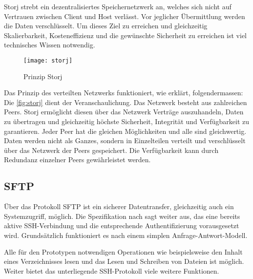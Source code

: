 Storj strebt ein dezentralisiertes Speichernetzwerk an, welches sich nicht auf Vertrauen zwischen Client und Host verlässt. Vor jeglicher Übermittlung werden die Daten verschlüsselt. Um dieses Ziel zu erreichen und gleichzeitig Skalierbarkeit, Kosteneffizienz und die gewünschte Sicherheit zu erreichen ist viel technisches Wissen notwendig. 


    \begin{figure}[H]
    \centering
    \texttt{[image: storj]}
    \caption[Prinzip Storj aus \cite{wilkinson2014storj}]{Prinzip Storj}
    \label{fig:storj}
    \end{figure}
 


Das Prinzip des verteilten Netzwerks funktioniert, wie \cite[S.~2-16]{wilkinson2014storj} erklärt, folgendermassen: Die \autoref{fig:storj} dient der Veranschaulichung. Das Netzwerk besteht aus zahlreichen Peers. Storj ermöglicht diesen über das Netzwerk Verträge auszuhandeln, Daten zu übertragen und gleichzeitig höchste Sicherheit, Integrität und Verfügbarkeit zu garantieren. Jeder Peer hat die gleichen Möglichkeiten und alle sind gleichwertig. Daten werden nicht als Ganzes, sondern in Einzelteilen verteilt und verschlüsselt über das Netzwerk der Peers gespeichert. Die Verfügbarkeit kann durch Redundanz einzelner Peers ge\-währ\-leist\-et werden.



\subsection{\gls{SFTP}}

Über das Protokoll SFTP ist ein sicherer Datentransfer, gleichzeitig auch ein Systemzugriff, möglich. Die Spezifikation nach \cite[S.~3]{galbraith2006ssh} sagt weiter aus, das eine bereits aktive SSH-Verbindung und die entsprechende Authentifizierung vorausgesetzt wird. Grundsätzlich funktioniert es nach einem simplen Anfrage-Antwort-Modell.

Alle für den Prototypen notwendigen Operationen wie beispielsweise den Inhalt eines Verzeichnisses lesen und das Lesen und Schreiben von Dateien ist möglich. Weiter bietet das unterliegende SSH-Protokoll viele weitere Funktionen.

